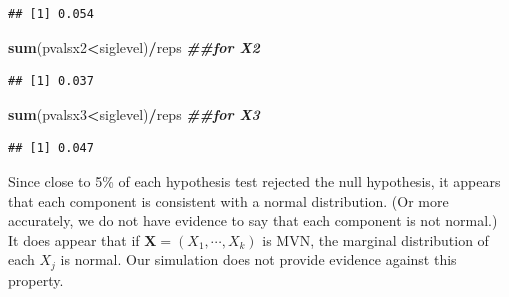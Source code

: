 \documentclass[
]{book}
\newenvironment{Shaded}{\begin{snugshade}}{\end{snugshade}}
\newcommand{\DocumentationTok}[1]{\textcolor[rgb]{0.56,0.35,0.01}{\textbf{\textit{#1}}}}
\newcommand{\FunctionTok}[1]{\textcolor[rgb]{0.13,0.29,0.53}{\textbf{#1}}}
\newcommand{\NormalTok}[1]{#1}
\newcommand{\OtherTok}[1]{\textcolor[rgb]{0.56,0.35,0.01}{#1}}
\newcommand{\SpecialCharTok}[1]{\textcolor[rgb]{0.81,0.36,0.00}{\textbf{#1}}}
\begin{document}
\begin{Shaded}
\end{Shaded}

\begin{verbatim}
## [1] 0.054
\end{verbatim}

\begin{Shaded}
\begin{Highlighting}[]
\FunctionTok{sum}\NormalTok{(pvalsx2}\SpecialCharTok{\textless{}}\NormalTok{siglevel)}\SpecialCharTok{/}\NormalTok{reps }\DocumentationTok{\#\#for X2}
\end{Highlighting}
\end{Shaded}

\begin{verbatim}
## [1] 0.037
\end{verbatim}

\begin{Shaded}
\begin{Highlighting}[]
\FunctionTok{sum}\NormalTok{(pvalsx3}\SpecialCharTok{\textless{}}\NormalTok{siglevel)}\SpecialCharTok{/}\NormalTok{reps }\DocumentationTok{\#\#for X3}
\end{Highlighting}
\end{Shaded}

\begin{verbatim}
## [1] 0.047
\end{verbatim}

Since close to 5\% of each hypothesis test rejected the null hypothesis, it appears that each component is consistent with a normal distribution. (Or more accurately, we do not have evidence to say that each component is not normal.) It does appear that if \(\boldsymbol{X} = (X_1, \cdots, X_k)\) is MVN, the marginal distribution of each \(X_j\) is normal. Our simulation does not provide evidence against this property.
\end{document}
